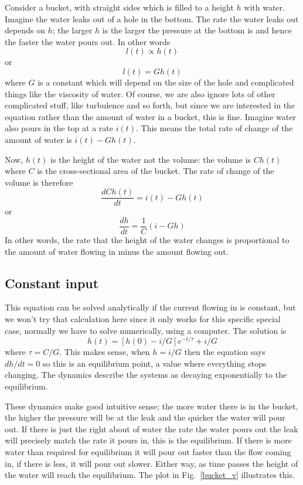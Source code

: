 \documentclass[11pt,a4paper]{scrartcl}
\begin{document}
Consider a bucket, with straight sides which is filled to a height $h$
with water. Imagine the water leaks out of a hole in the bottom. The
rate the water leaks out depends on $h$; the larger $h$ is the larger
the pressure at the bottom is and hence the faster the water pours
out. In other words
\begin{equation}
l(t)\propto h(t)
\end{equation}
or 
\begin{equation}
l(t)= G h(t)
\end{equation}
where $G$ is a constant which will depend on the size of the hole and
complicated things like the viscosity of water. Of course, we are also
ignore lots of other complicated stuff, like turbulence and so forth, but
since we are interested in the equation rather than the amount of
water in a bucket, this is fine. Imagine water also pours in the top
at a rate $i(t)$. This means the total rate of change of the amount of
water is $i(t)-Gh(t)$.

Now, $h(t)$ is the height of the water not the volume: the volume is
$Ch(t)$ where $C$ is the cross-sectional area of the bucket. The rate
of change of the volume is therefore
\begin{equation}
\frac{dCh(t)}{dt}=i(t)-Gh(t)
\end{equation}
or
\begin{equation}
\frac{dh}{dt}=\frac{1}{C}(i-Gh)
\end{equation}
In other words, the rate that the height of the water changes is
proportional to the amount of water flowing in minus the amount
flowing out.

\subsection*{Constant input}

This equation can be solved analytically if the current flowing in is
constant, but we won't try that calculation here since it only works
for this specific special case, normally we have to solve numerically,
using a computer. The solution is
\begin{equation}
h(t)=[h(0)-i/G]e^{-t/\tau}+i/G
\end{equation}
where $\tau=C/G$. This makes sense, when $h=i/G$ then the equation
says $dh/dt=0$ so this is an equilibrium point, a value where
everything stops changing. The dynamics describe the systems as
decaying exponentially to the equilibrium.

These dynamics make good intuitive sense; the more water there is in
the bucket, the higher the pressure will be at the leak and the
quicker the water will pour out. If there is just the right about of
water the rate the water pours out the leak will precisely match the
rate it pours in, this is the equilibrium. If there is more water than
required for equilibrium it will pour out faster than the flow coming
in, if there is less, it will pour out slower. Either way, as time
passes the height of the water will reach the equilibrium. The plot in
Fig.~\ref{bucket_v} illustrates this.
\end{document}
